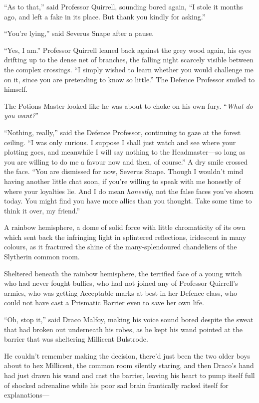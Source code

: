 “As to that,” said Professor Quirrell, sounding bored again, “I stole it months ago, and left a fake in its place. But thank you kindly for asking.”

“You’re lying,” said Severus Snape after a pause.

“Yes, I am.” Professor Quirrell leaned back against the grey wood again, his eyes drifting up to the dense net of branches, the falling night scarcely visible between the complex crossings. “I simply wished to learn whether you would challenge me on it, since you are pretending to know so little.” The Defence Professor smiled to himself.

The Potions Master looked like he was about to choke on his own fury. “\emph{What do you want?}”

“Nothing, really,” said the Defence Professor, continuing to gaze at the forest ceiling. “I was only curious. I suppose I shall just watch and see where your plotting goes, and meanwhile I will say nothing to the Headmaster—so long as you are willing to do me a favour now and then, of course.” A dry smile crossed the face. “You are dismissed for now, Severus Snape. Though I wouldn’t mind having another little chat soon, if you’re willing to speak with me honestly of where your loyalties lie. And I do mean \emph{honestly}, not the false faces you’ve shown today. You might find you have more allies than you thought. Take some time to think it over, my friend.”


A rainbow hemisphere, a dome of solid force with little chromaticity of its own which sent back the infringing light in splintered reflections, iridescent in many colours, as it fractured the shine of the many-splendoured chandeliers of the Slytherin common room.

Sheltered beneath the rainbow hemisphere, the terrified face of a young witch who had never fought bullies, who had not joined any of Professor Quirrell’s armies, who was getting Acceptable marks at best in her Defence class, who could not have cast a Prismatic Barrier even to save her own life.

“Oh, stop it,” said Draco Malfoy, making his voice sound bored despite the sweat that had broken out underneath his robes, as he kept his wand pointed at the barrier that was sheltering Millicent Bulstrode.

He couldn’t remember making the decision, there’d just been the two older boys about to hex Millicent, the common room silently staring, and then Draco’s hand had just drawn his wand and cast the barrier, leaving his heart to pump itself full of shocked adrenaline while his poor sad brain frantically racked itself for explanations—

